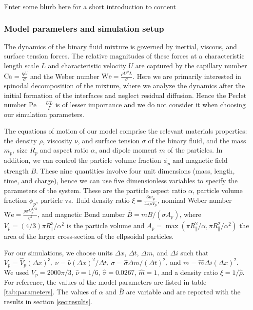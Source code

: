 Enter some blurb here for a short introduction to content

\subsubsection{Model parameters and simulation setup}\label{sec:parameters}

The dynamics of the binary fluid mixture is governed by inertial,
viscous, and surface tension forces. The relative magnitudes of these
forces at a characteristic length scale \(L\) and characteristic
velocity \(U\) are captured by the capillary number $\mathrm{Ca}=\frac{\eta U}{\sigma}$ and the Weber number
\(\mathrm{We}=\frac{\rho U^2 L}{\sigma}\). Here we are primarily interested in spinodal decomposition of the mixture, 
where we analyze the dynamics after the initial formation of the interfaces and neglect residual diffusion. Hence the 
Peclet number \(\mathrm{Pe}=\frac{UL}{\Gamma}\) is of lesser importance and we do not consider it when choosing our 
simulation parameters.

The equations of motion of our model comprise the relevant materials
properties: the density \(\rho\), viscosity \(\nu\), and surface tension \(\sigma\) of the binary fluid, and the mass \(m_p\), size \(R_p\) and aspect ratio \(\alpha\), and dipole moment \(m\) of the particles. In addition, we can control the particle volume fraction \(\phi_p\) and
magnetic field strength \(B\). These nine quantities involve four unit
dimensions (mass, length, time, and charge), hence we can use five
dimensionless variables to specify the parameters of the system. These
are the particle aspect ratio $\alpha$, particle volume fraction
\(\phi_p\), particle vs.~fluid density ratio
$\xi = \frac{3m_p}{4\pi \rho V_p}$, nominal Weber number $\mathrm{We} = \frac{\rho \sigma V_p^{1/3}}{\eta^2}$, and magnetic Bond
number \(\bar{B} = m B/(\sigma A_p)\), where
\(V_p=(4/3)\pi R_\parallel^3/\alpha^2\) is the particle volume and
\(A_p=\max\left( \pi R_\parallel^2/\alpha, \pi R_\parallel^2/\alpha^2 \right)\)
the area of the larger cross-section of the ellpsoidal particles.

For our simulations, we choose units \(\Delta x\), \(\Delta t\),
\(\Delta m\), and \(\Delta i\) such that \(V_p=\hat{V}_p(\Delta x)^3\),
\(\nu=\hat{\nu}(\Delta x)^2/\Delta t\),
\(\sigma=\hat{\sigma}\Delta m/(\Delta t)^2\), and
\(m=\hat{m}\Delta i(\Delta x)^2\). We used \(V_p=2000\pi/3\),
\(\hat{\nu}=1/6\), \(\hat{\sigma}=0.0267\), \(\hat{m}=1\), and a density
ratio \(\xi=1/\hat{\rho}\). For reference, the values of the model
parameters are listed in table \ref{tab:parameters}. The values of
\(\alpha\) and \(\bar{B}\) are variable and are reported
with the results in section \ref{sec:results}.


